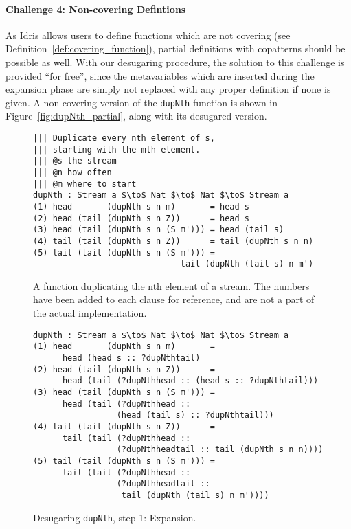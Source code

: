 \paragraph{Challenge 4: Non-covering Defintions} As Idris allows users to
define functions which are not covering (see
Definition~\ref{def:covering_function}), partial definitions with copatterns
should be possible as well. With our desugaring procedure, the solution to this
challenge is provided ``for free'', since the metavariables which are inserted
during the expansion phase are simply not replaced with any proper definition if
none is given. A non-covering version of the \texttt{dupNth} function is shown
in Figure~\ref{fig:dupNth_partial}, along with its desugared version.

\begin{figure}
\begin{lstlisting}[mathescape]
||| Duplicate every nth element of s, 
||| starting with the mth element.
||| @s the stream
||| @n how often
||| @m where to start
dupNth : Stream a $\to$ Nat $\to$ Nat $\to$ Stream a
(1) head       (dupNth s n m)       = head s
(2) head (tail (dupNth s n Z))      = head s
(3) head (tail (dupNth s n (S m'))) = head (tail s)
(4) tail (tail (dupNth s n Z))      = tail (dupNth s n n)
(5) tail (tail (dupNth s n (S m'))) = 
                              tail (dupNth (tail s) n m')
\end{lstlisting}
  \caption{A function duplicating the nth element of a stream. The numbers have been
  added to each clause for reference, and are not a part of the actual implementation.}
  \label{fig:dupNth}
\end{figure}

\begin{figure}
\begin{lstlisting}[mathescape]
dupNth : Stream a $\to$ Nat $\to$ Nat $\to$ Stream a
(1) head       (dupNth s n m)       =
      head (head s :: ?dupNthtail)
(2) head (tail (dupNth s n Z))      = 
      head (tail (?dupNthhead :: (head s :: ?dupNthtail)))
(3) head (tail (dupNth s n (S m'))) =
      head (tail (?dupNthhead :: 
                 (head (tail s) :: ?dupNthtail)))
(4) tail (tail (dupNth s n Z))      =
      tail (tail (?dupNthhead :: 
                 (?dupNthheadtail :: tail (dupNth s n n))))
(5) tail (tail (dupNth s n (S m'))) =
      tail (tail (?dupNthhead :: 
                 (?dupNthheadtail :: 
                  tail (dupNth (tail s) n m'))))
\end{lstlisting}
  \caption{Desugaring \texttt{dupNth}, step 1: Expansion.}
  \label{fig:desugared_dupNth_step1}
\end{figure}

